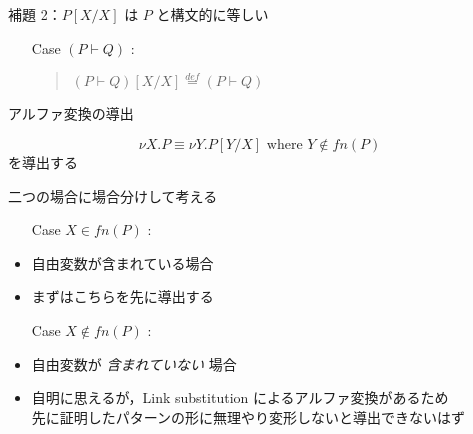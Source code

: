 \begin{frame}{補題 2：$P[X/X]$ は $P$ と構文的に等しい}
{{\begin{itemize}
\begin{quote}
          Since \(Y \neq X \land Y = X\) could never happen,
          there is no chance for ``variable capturing'' and
          $\alpha$-conversion for its avoidance
          (the third option of the link substitution scheme for the link creation),
          which possibly makes the process not syntactically equivalent
          (\(\alpha\)-equivalent though), won't happen.
        \end{quote}
      \item[Case] \((P \vdash Q)\) :\\
        \begin{quote}
          \( (P \vdash Q)[X/X] \overset{def}{=} (P \vdash Q)\)
        \end{quote}
      \end{itemize}
  }}
\end{frame}

\begin{frame}{アルファ変換の導出}
  
  \[\nu X.P \equiv \nu Y.P[Y / X] \mbox{ where } Y \notin \mathit{fn}(P)\]
  を導出する

  二つの場合に場合分けして考える

  \begin{myframe}
    \small
    \begin{itemize}
    \item[Case] \(X \in \mathit{fn}(P)\) :\\
    \item
      自由変数が含まれている場合
    \item
      まずはこちらを先に導出する
    \item[Case] \(X \notin \mathit{fn}(P)\) :\\
    \item
      自由変数が \emph{含まれていない} 場合
    \item
      自明に思えるが，Link substitution によるアルファ変換があるため\\
      先に証明したパターンの形に無理やり変形しないと導出できない{\scriptsize はず}
    \end{itemize}
  \end{myframe}
  
\end{frame}


